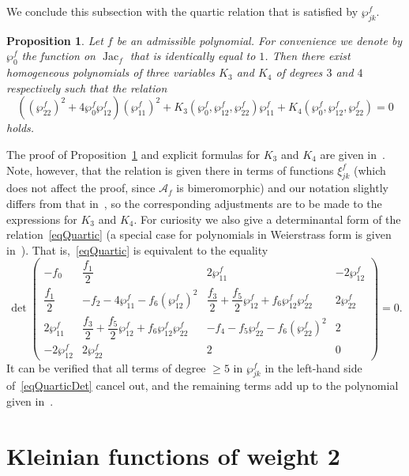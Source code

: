\documentclass{amsart}
\numberwithin{equation}{section}
\newtheorem{proposition}[theorem]{Proposition}
\theoremstyle{definition}
\theoremstyle{remark}
\DeclareMathOperator{\Jac}{Jac}
\begin{document}
	We conclude this subsection with the quartic relation that is satisfied by $\wp_{jk}^f$.
	\begin{proposition}\label{propQuarticRelation}
		Let $f$ be an admissible polynomial. For convenience we denote by $\wp_{0}^f$ the function on $\Jac_f$ that is identically equal to $1$. Then there exist homogeneous polynomials of three variables $K_3$ and $K_4$ of degrees $3$ and $4$ respectively such that the relation
		\begin{equation}\label{eqQuartic}
			\left(\left(\wp_{22}^f\right)^2 + 4\wp_{0}^f\wp_{12}^f\right)\left(\wp_{11}^f\right)^2 + K_3\left(\wp_{0}^f, \wp_{12}^f, \wp_{22}^f\right)\wp_{11}^f + K_4\left(\wp_{0}^f, \wp_{12}^f, \wp_{22}^f\right) = 0
		\end{equation}
		holds.
	\end{proposition}
	The proof of Proposition~\ref{propQuarticRelation} and explicit formulas for $K_3$ and $K_4$ are given in~\cite[Section~3.1]{CasselsFlynn}. Note, however, that the relation is given there in terms of functions $\xi_{jk}^f$ (which does not affect the proof, since $\mathscr A_f$ is bimeromorphic) and our notation slightly differs from that in~\cite{CasselsFlynn}, so the corresponding adjustments are to be made to the expressions for $K_3$ and $K_4$. For curiosity we also give a determinantal form of the relation~\eqref{eqQuartic} (a special case for polynomials in Weierstrass form is given in~\cite{baker}). That is,~\eqref{eqQuartic} is equivalent to the equality
	\begin{equation}\label{eqQuarticDet}
		\det \begin{pmatrix}
			-f_0 & \dfrac{f_1}{2} & 2\wp_{11}^f & -2\wp_{12}^f\\
			\dfrac{f_1}{2} & -f_2 - 4\wp_{11}^f - f_6\left(\wp_{12}^f\right)^2 & \dfrac{f_3}{2} + \dfrac{f_5}{2}\wp_{12}^f + f_6 \wp_{12}^f\wp_{22}^f & 2\wp_{22}^f\\
			2\wp_{11}^f & \dfrac{f_3}{2} + \dfrac{f_5}{2}\wp_{12}^f + f_6 \wp_{12}^f\wp_{22}^f & -f_4 - f_5\wp_{22}^f - f_6 \left(\wp_{22}^f\right)^2 & 2\\
			-2\wp_{12}^f & 2\wp_{22}^f & 2 & 0
		\end{pmatrix} = 0.
	\end{equation}
	It can be verified that all terms of degree $\ge 5$ in $\wp_{jk}^f$ in the left-hand side of~\eqref{eqQuarticDet} cancel out, and the remaining terms add up to the polynomial given in~\cite[Section~3.1]{CasselsFlynn}.
	
	\section{Kleinian functions of weight 2}\label{secKleinianWeight2}
	
\end{document}
